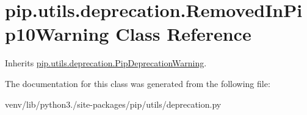 \hypertarget{classpip_1_1utils_1_1deprecation_1_1_removed_in_pip10_warning}{}\section{pip.\+utils.\+deprecation.\+Removed\+In\+Pip10\+Warning Class Reference}
\label{classpip_1_1utils_1_1deprecation_1_1_removed_in_pip10_warning}


Inherits \hyperlink{classpip_1_1utils_1_1deprecation_1_1_pip_deprecation_warning}{pip.\+utils.\+deprecation.\+Pip\+Deprecation\+Warning}.



The documentation for this class was generated from the following file\+:\begin{DoxyCompactItemize}
\item 
venv/lib/python3./site-\/packages/pip/utils/deprecation.\+py\end{DoxyCompactItemize}
